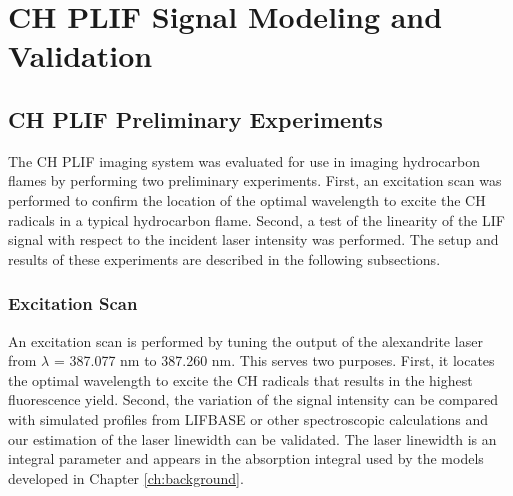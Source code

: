\chapter{CH PLIF Signal Modeling and Validation}
\label{ch:chplif}






\section{CH PLIF Preliminary Experiments}
\label{sec:chplif-preliminary-experiments}

The CH PLIF imaging system was evaluated for use in imaging hydrocarbon flames by performing two preliminary experiments.
First, an excitation scan was performed to confirm the location of the optimal wavelength to excite the CH radicals in a typical hydrocarbon flame.
Second, a test of the linearity of the LIF signal with respect to the incident laser intensity was performed.
The setup and results of these experiments are described in the following subsections.

\subsection{Excitation Scan}
\label{subsec:prelim-excitation-scan}



An excitation scan is performed by tuning the output of the alexandrite laser from \(\lambda\) = 387.077 nm to 387.260 nm.
This serves two purposes.
First, it locates the optimal wavelength to excite the CH radicals that results in the highest fluorescence yield.
Second, the variation of the signal intensity can be compared with simulated profiles from LIFBASE or other spectroscopic calculations and our estimation of the laser linewidth can be validated.
The laser linewidth is an integral parameter and appears in the absorption integral used by the models developed in Chapter \ref{ch:background}.

